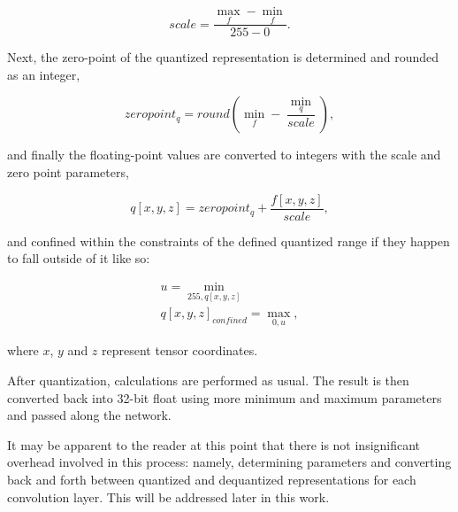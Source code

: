 \begin{equation}
\label{eqn:scale}
scale = \frac{\max_{f} - \min_{f}}{255 - 0}.
\end{equation}

Next, the zero-point of the quantized representation is determined and rounded as an integer,

\begin{equation}
\label{eqn:zero}
zero point_{q} = round(\min_{f} - \frac{\min_{q}}{scale}),
\end{equation}

and finally the floating-point values are converted to integers with the scale and zero point parameters,

\begin{equation}
\label{eqn:convert}
q[x,y,z] = zero point_{q} + \frac{f[x,y,z]}{scale},
\end{equation}

and confined within the constraints of the defined quantized range if they happen to fall outside of it \cite{gemmlowp} like so:

\begin{equation}
\label{eqn:clamp}
\begin{aligned}
u = \min_{255, q[x,y,z]}
\\
q[x,y,z]_{confined} = \max_{0, u},
\end{aligned}
\end{equation}

where $x$, $y$ and $z$ represent tensor coordinates.

After quantization, calculations are performed as usual. The result is then converted back into 32-bit float using more minimum and maximum parameters and passed along the network.

It may be apparent to the reader at this point that there is not insignificant overhead involved in this process: namely, determining parameters and converting back and forth between quantized and dequantized representations for each convolution layer. This will be addressed later in this work.